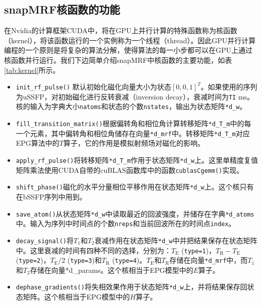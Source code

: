 \subsection{snapMRF核函数的功能}
在Nvidia的计算框架CUDA中，将在GPU上并行计算的特殊函数称为核函数（kernel），将该函数运行的一个实例称为一个线程（thread）。因此GPU并行计算编程的一个原则是将复杂的算法分解，使得算法的每一小步都可以在GPU上通过核函数并行运行。我们下边简单介绍snapMRF中核函数的主要功能，如表\ref{tab:kernel}所示。

\begin{itemize}
	\item \texttt{init\_rf\_pulse()} 默认初始化磁化向量大小为状态$[0,0,1]^T$。如果使用的序列为uSSFP，对初始磁化进行反转衰减（inversion decay），衰减时间为\texttt{TI} ms。核的输入为字典大小\texttt{natoms}和状态的个数\texttt{nstates}，输出为状态矩阵\texttt{*d\_w}。 
	
	\item \texttt{fill\_transition\_matrix()}根据偏转角和相位角计算转移矩阵\texttt{*d\_T\_m}中的每一个元素，其中偏转角和相位角储存在向量\texttt{*d\_mrf}中。转移矩阵\texttt{*d\_T\_m}对应EPG算法中的$T$算子，它的作用是模拟射频场对磁化的影响。
	
	\item \texttt{apply\_rf\_pulse()}将转移矩阵\texttt{*d\_T\_m}作用于状态矩阵\texttt{*d\_w}上。这里单精度复值矩阵乘法使用CUDA自带的cuBLAS函数库中的函数\texttt{cublasCgemm()}实现。
	
	\item \texttt{shift\_phase()}磁化的水平分量相位平移作用在状态矩阵\texttt{*d\_w}上。这个核只有在bSSFP序列中用到。
	
	\item \texttt{save\_atom()}从状态矩阵\texttt{*d\_w}中读取最近的回波强度，并储存在字典\texttt{*d\_atoms}中。输入为序列中时间点的个数\texttt{nreps}和当前回波所在的时间点\texttt{index}。
	
	\item \texttt{decay\_signal()}将$T_1$和$T_2$衰减作用在状态矩阵\texttt{*d\_w}中并把结果保存在状态矩阵中。这里衰减的时间有四种不同的选择，分别为：$T_\mathrm{E}$ (\texttt{type=1})，$T_\mathrm{R}-T_\mathrm{E}$ (\texttt{type=2})，$T_\mathrm{E}/2$ (\texttt{type=3})和$T_\mathrm{R}$ (\texttt{type=4})。$T_\mathrm{E}$和$T_\mathrm{R}$存储在向量\texttt{*d\_mrf}中，而$T_1$和$T_2$存储在向量{*d\_params}。这个核相当于EPG模型中的$E$算子。
	
	\item \texttt{dephase\_gradients()}将失相效果作用于状态矩阵\texttt{*d\_w}上，并将结果保存回状态矩阵。这个核相当于EPG模型中的$H$算子。
\end{itemize}

